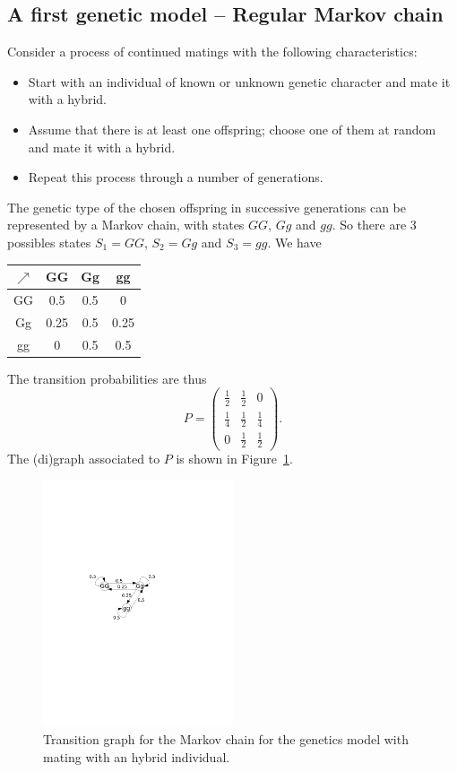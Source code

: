 \subsection{A first genetic model -- Regular Markov chain}
Consider a process of continued matings with the following characteristics:
\begin{itemize}
\item Start with an individual of known or unknown
genetic character and mate it with a hybrid. 
\item Assume that there is at least one
offspring; choose one of them at random and mate it with a hybrid.
\item Repeat this process through a number of generations. 
\end{itemize}
The genetic type of the chosen
offspring in successive generations can be represented by a Markov chain, with states $GG$, $Gg$ and $gg$. So there are 3 possibles states $S_1=GG$, $S_2=Gg$ and $S_3=gg$.
We have
\begin{center}
\begin{tabular}{c|ccc}
$\nearrow$ & GG & Gg & gg \\
\hline
GG & 0.5 & 0.5 & 0 \\
Gg & 0.25 & 0.5 & 0.25 \\
gg & 0 & 0.5 & 0.5
\end{tabular}
\end{center}
The transition probabilities are thus
\[
P=\left (
\begin{array}{ccc}
\frac 12 & \frac 12 & 0 \\
\frac 14 & \frac 12 & \frac 14 \\
0 & \frac 12 & \frac 12
\end{array}\right).
\]
The (di)graph associated to $P$ is shown in Figure~\ref{fig:Markov_graph1}.
\begin{figure}[htbp]
\begin{center}
\includegraphics[width=0.5\textwidth]{../figs_08_genetics/graphe_hybride}
\caption{Transition graph for the Markov chain for the genetics model with mating with an hybrid individual.}
\label{fig:Markov_graph1}
\end{center}
\end{figure}
